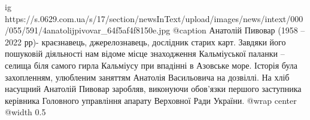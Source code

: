  
 
 
 
 

\ifcmt
  ig https://s.0629.com.ua/s/17/section/newsInText/upload/images/news/intext/000/055/591/4anatolijpivovar_64f5af4f8150e.jpg
	@caption Анатолій Пивовар (1958 – 2022 рр)- краєзнавець, джерелознавець, дослідник старих карт. Завдяки його пошуковій діяльності нам відоме місце знаходження Кальміуської паланки – селища біля самого гирла Кальміусу при впадінні в Азовське море. Історія була захопленням, улюбленим заняттям Анатолія Васильовича на дозвіллі. На хліб насущний Анатолій Пивовар заробляв, виконуючи обов'язки першого заступника керівника Головного управління апарату Верховної Ради України.
  @wrap center
  @width 0.5
\fi

